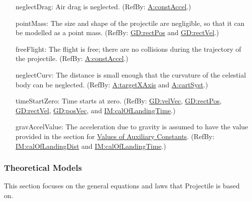 \documentclass[12pt]{article}
\begin{document}
\begin{itemize}
\item[neglectDrag:\phantomsection\label{neglectDrag}]{Air drag is neglected. (RefBy: \hyperref[constAccel]{A:constAccel}.)}
\item[pointMass:\phantomsection\label{pointMass}]{The size and shape of the projectile are negligible, so that it can be modelled as a point mass. (RefBy: \hyperref[GD:rectPos]{GD:rectPos} and \hyperref[GD:rectVel]{GD:rectVel}.)}
\item[freeFlight:\phantomsection\label{freeFlight}]{The flight is free; there are no collisions during the trajectory of the projectile. (RefBy: \hyperref[constAccel]{A:constAccel}.)}
\item[neglectCurv:\phantomsection\label{neglectCurv}]{The distance is small enough that the curvature of the celestial body can be neglected. (RefBy: \hyperref[targetXAxis]{A:targetXAxis} and \hyperref[cartSyst]{A:cartSyst}.)}
\item[timeStartZero:\phantomsection\label{timeStartZero}]{Time starts at zero. (RefBy: \hyperref[GD:velVec]{GD:velVec}, \hyperref[GD:rectPos]{GD:rectPos}, \hyperref[GD:rectVel]{GD:rectVel}, \hyperref[GD:posVec]{GD:posVec}, and \hyperref[IM:calOfLandingTime]{IM:calOfLandingTime}.)}
\item[gravAccelValue:\phantomsection\label{gravAccelValue}]{The acceleration due to gravity is assumed to have the value provided in the section for \hyperref[Sec:AuxConstants]{Values of Auxiliary Constants}. (RefBy: \hyperref[IM:calOfLandingDist]{IM:calOfLandingDist} and \hyperref[IM:calOfLandingTime]{IM:calOfLandingTime}.)}
\end{itemize}
\subsubsection{Theoretical Models}
\label{Sec:TMs}
This section focuses on the general equations and laws that Projectile is based on.
\end{document}
